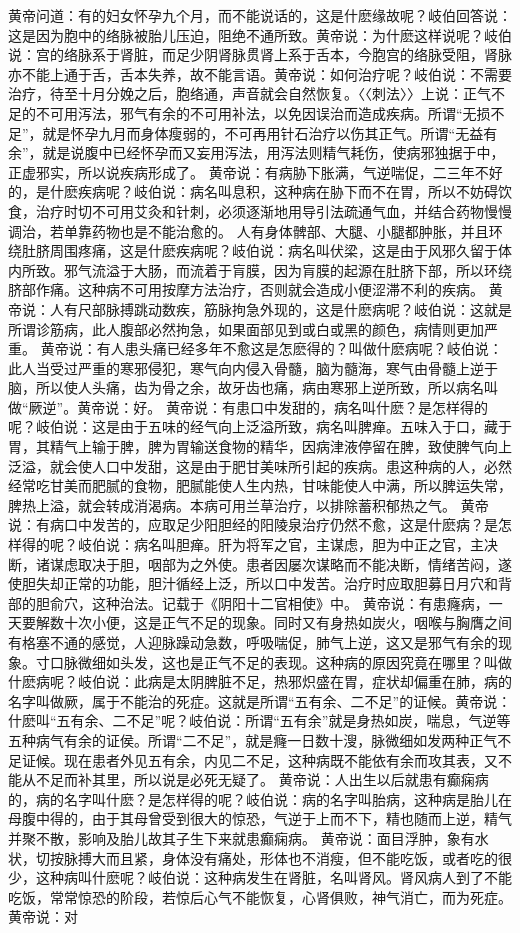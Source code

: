 \documentclass[a4paper,12pt,UTF8,twoside]{ctexbook}
\begin{document}
黄帝问道：有的妇女怀孕九个月，而不能说话的，这是什麽缘故呢？岐伯回答说：这是因为胞中的络脉被胎儿压迫，阻绝不通所致。黄帝说：为什麽这样说呢？岐伯说：宫的络脉系于肾脏，而足少阴肾脉贯肾上系于舌本，今胞宫的络脉受阻，肾脉亦不能上通于舌，舌本失养，故不能言语。黄帝说：如何治疗呢？岐伯说：不需要治疗，待至十月分娩之后，胞络通，声音就会自然恢复。〈〈刺法〉〉上说：正气不足的不可用泻法，邪气有余的不可用补法，以免因误治而造成疾病。所谓“无损不足”，就是怀孕九月而身体瘦弱的，不可再用针石治疗以伤其正气。所谓“无益有余”，就是说腹中已经怀孕而又妄用泻法，用泻法则精气耗伤，使病邪独据于中，正虚邪实，所以说疾病形成了。
黄帝说：有病胁下胀满，气逆喘促，二三年不好的，是什麽疾病呢？岐伯说：病名叫息积，这种病在胁下而不在胃，所以不妨碍饮食，治疗时切不可用艾灸和针刺，必须逐渐地用导引法疏通气血，并结合药物慢慢调治，若单靠药物也是不能治愈的。
人有身体髀部、大腿、小腿都肿胀，并且环绕肚脐周围疼痛，这是什麽疾病呢？岐伯说：病名叫伏梁，这是由于风邪久留于体内所致。邪气流溢于大肠，而流着于肓膜，因为肓膜的起源在肚脐下部，所以环绕脐部作痛。这种病不可用按摩方法治疗，否则就会造成小便涩滞不利的疾病。
黄帝说：人有尺部脉搏跳动数疾，筋脉拘急外现的，这是什麽病呢？岐伯说：这就是所谓诊筋病，此人腹部必然拘急，如果面部见到或白或黑的颜色，病情则更加严重。
黄帝说：有人患头痛已经多年不愈这是怎麽得的？叫做什麽病呢？岐伯说：此人当受过严重的寒邪侵犯，寒气向内侵入骨髓，脑为髓海，寒气由骨髓上逆于脑，所以使人头痛，齿为骨之余，故牙齿也痛，病由寒邪上逆所致，所以病名叫做“厥逆”。黄帝说：好。
黄帝说：有患口中发甜的，病名叫什麽？是怎样得的呢？岐伯说：这是由于五味的经气向上泛溢所致，病名叫脾瘅。五味入于口，藏于胃，其精气上输于脾，脾为胃输送食物的精华，因病津液停留在脾，致使脾气向上泛溢，就会使人口中发甜，这是由于肥甘美味所引起的疾病。患这种病的人，必然经常吃甘美而肥腻的食物，肥腻能使人生内热，甘味能使人中满，所以脾运失常，脾热上溢，就会转成消渴病。本病可用兰草治疗，以排除蓄积郁热之气。
黄帝说：有病口中发苦的，应取足少阳胆经的阳陵泉治疗仍然不愈，这是什麽病？是怎样得的呢？岐伯说：病名叫胆瘅。肝为将军之官，主谋虑，胆为中正之官，主决断，诸谋虑取决于胆，咽部为之外使。患者因屡次谋略而不能决断，情绪苦闷，遂使胆失却正常的功能，胆汁循经上泛，所以口中发苦。治疗时应取胆募日月穴和背部的胆俞穴，这种治法。记载于《阴阳十二官相使》中。
黄帝说：有患癃病，一天要解数十次小便，这是正气不足的现象。同时又有身热如炭火，咽喉与胸膺之间有格塞不通的感觉，人迎脉躁动急数，呼吸喘促，肺气上逆，这又是邪气有余的现象。寸口脉微细如头发，这也是正气不足的表现。这种病的原因究竟在哪里？叫做什麽病呢？岐伯说：此病是太阴脾脏不足，热邪炽盛在胃，症状却偏重在肺，病的名字叫做厥，属于不能治的死症。这就是所谓“五有余、二不足”的证候。黄帝说：什麽叫“五有余、二不足”呢？岐伯说：所谓“五有余”就是身热如炭，喘息，气逆等五种病气有余的证侯。所谓“二不足”，就是癃一日数十溲，脉微细如发两种正气不足证候。现在患者外见五有余，内见二不足，这种病既不能依有余而攻其表，又不能从不足而补其里，所以说是必死无疑了。
黄帝说：人出生以后就患有癫痫病的，病的名字叫什麽？是怎样得的呢？岐伯说：病的名字叫胎病，这种病是胎儿在母腹中得的，由于其母曾受到很大的惊恐，气逆于上而不下，精也随而上逆，精气并聚不散，影响及胎儿故其子生下来就患癫痫病。
黄帝说：面目浮肿，象有水状，切按脉搏大而且紧，身体没有痛处，形体也不消瘦，但不能吃饭，或者吃的很少，这种病叫什麽呢？岐伯说：这种病发生在肾脏，名叫肾风。肾风病人到了不能吃饭，常常惊恐的阶段，若惊后心气不能恢复，心肾俱败，神气消亡，而为死症。黄帝说：对
\end{document}
